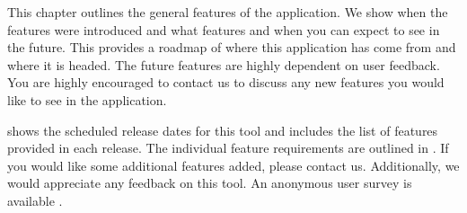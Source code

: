 This chapter outlines the general features of the \texttt{\getsoftwarename{}} application. We show when the features were introduced and what features and when you can expect to see in the future. This provides a roadmap of where this application has come from and where it is headed. The future features are highly dependent on user feedback. You are highly encouraged to contact us to discuss any new features you would like to see in the application.\\


 shows the scheduled release dates for this tool and includes the list of features provided in each release. The individual feature requirements are outlined in . If you would like some additional features added, please contact us.
Additionally, we would appreciate any feedback on this tool. An anonymous
user survey is available . \\

